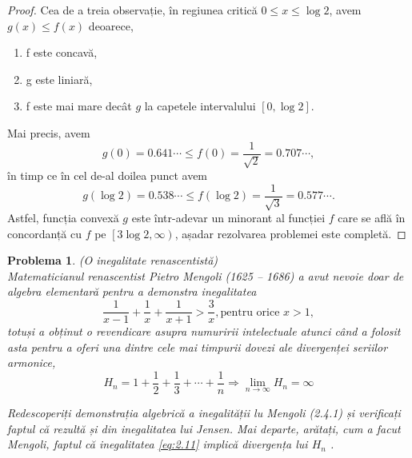 \documentclass[a4paper,12pt,oneside]{report}
\newtheorem{problem}{Problema}
\begin{document}
\begin{proof}
Cea de a treia observație, în regiunea critică \(0\leq  x \leq \log2\), avem \(g\left ( x \right ) \leq  f\left ( x \right )\) deoarece,
\begin{enumerate}
  \item f este concavă,
  \item g este liniară,
  \item f este mai mare decât \(g\) la capetele intervalului \(\left [ 0 , \log 2 \right ]\).
\end{enumerate}
Mai precis, avem
\begin{displaymath}
  g\left ( 0 \right ) = 0.641\cdots \leq f\left ( 0 \right ) = \frac{1}{\sqrt{2}} = 0.707\cdots,
\end{displaymath}
în timp ce în cel de-al doilea punct avem
\begin{displaymath}
  g\left ( \log 2 \right ) = 0.538\cdots  \leq f\left ( \log2 \right ) = \frac{1}{\sqrt{3}} = 0.577\cdots.
\end{displaymath}
Astfel, funcția convexă \(g\) este într-adevar un minorant al funcției \(f\) care se află în concordanță cu \(f\) pe \(\left [ 3\log 2 , \infty  \right )\), așadar rezolvarea problemei este completă.
\end{proof}
\begin{problem} (O inegalitate renascentistă)\\
   Matematicianul renascentist Pietro Mengoli (1625 – 1686) a avut nevoie doar de algebra elementară pentru a demonstra inegalitatea
 \begin{displaymath}
   \frac{1}{x - 1} + \frac{1}{x} + \frac{1}{x + 1} > \frac{3}{x} , \text{pentru orice } x > 1, \label{eq:2.11} \tag{2.11}
 \end{displaymath}
totuși a obținut o revendicare asupra numuririi intelectuale atunci când a folosit asta pentru a oferi una dintre cele mai timpurii dovezi ale divergenței seriilor armonice,
\begin{displaymath}
  H_{n} = 1 + \frac{1}{2} + \frac{1}{3} + \cdots + \frac{1}{n} \Rightarrow \lim_{n \to \infty } H_{n} = \infty \label{eq:2.12} \tag{2.12}
\end{displaymath}

Redescoperiți demonstrația algebrică a inegalității lu Mengoli (2.4.1) și verificați faptul că rezultă și din inegalitatea lui Jensen. Mai departe, arătați, cum a facut Mengoli, faptul că inegalitatea \ref{eq:2.11} implică divergența lui \(H_{n}\) .
\end{problem}
\end{document}
